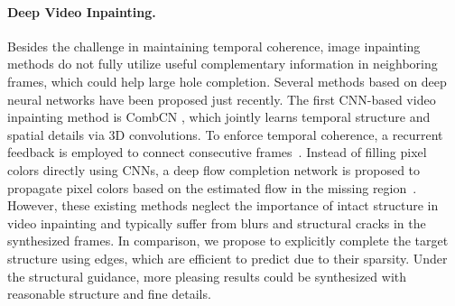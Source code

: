 \paragraph{Deep Video Inpainting.}
Besides the challenge in maintaining temporal coherence, image inpainting methods do not fully utilize useful complementary information in neighboring frames, which could help large hole completion.
Several methods based on deep neural networks have been proposed just recently.
%
The first CNN-based video inpainting method is CombCN \cite{wang2019video}, which jointly learns temporal structure and spatial details via 3D convolutions.
%
To enforce temporal coherence, a recurrent feedback is employed to connect consecutive frames~\cite{Kim_2019_CVPR,Kim_2019_CVPR1}. 
Instead of filling pixel colors directly using CNNs, a deep flow completion network is proposed to propagate pixel colors based on the estimated flow in the missing region~\cite{Xu_2019_CVPR}.
%
However, these existing methods neglect the importance of intact structure in video inpainting and typically suffer from blurs and structural cracks in the synthesized frames.  
In comparison, we propose to explicitly complete the target structure using edges, which are efficient to predict due to their sparsity. 
Under the structural guidance, more pleasing results could be synthesized with reasonable structure and fine details. 






























